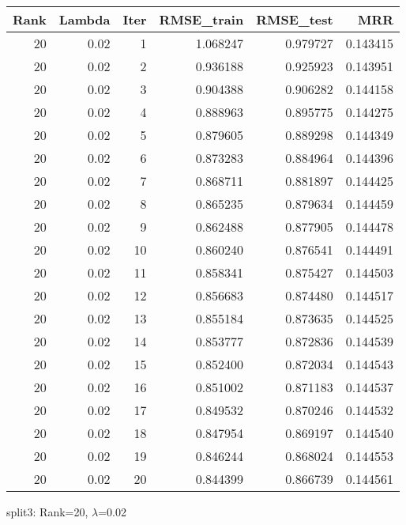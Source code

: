 \begin{tabular}{rrrrrr}
\toprule
 Rank &  Lambda &  Iter &  RMSE\_train &  RMSE\_test &       MRR \\
\midrule
   20 &    0.02 &     1 &    1.068247 &   0.979727 &  0.143415 \\
   20 &    0.02 &     2 &    0.936188 &   0.925923 &  0.143951 \\
   20 &    0.02 &     3 &    0.904388 &   0.906282 &  0.144158 \\
   20 &    0.02 &     4 &    0.888963 &   0.895775 &  0.144275 \\
   20 &    0.02 &     5 &    0.879605 &   0.889298 &  0.144349 \\
   20 &    0.02 &     6 &    0.873283 &   0.884964 &  0.144396 \\
   20 &    0.02 &     7 &    0.868711 &   0.881897 &  0.144425 \\
   20 &    0.02 &     8 &    0.865235 &   0.879634 &  0.144459 \\
   20 &    0.02 &     9 &    0.862488 &   0.877905 &  0.144478 \\
   20 &    0.02 &    10 &    0.860240 &   0.876541 &  0.144491 \\
   20 &    0.02 &    11 &    0.858341 &   0.875427 &  0.144503 \\
   20 &    0.02 &    12 &    0.856683 &   0.874480 &  0.144517 \\
   20 &    0.02 &    13 &    0.855184 &   0.873635 &  0.144525 \\
   20 &    0.02 &    14 &    0.853777 &   0.872836 &  0.144539 \\
   20 &    0.02 &    15 &    0.852400 &   0.872034 &  0.144543 \\
   20 &    0.02 &    16 &    0.851002 &   0.871183 &  0.144537 \\
   20 &    0.02 &    17 &    0.849532 &   0.870246 &  0.144532 \\
   20 &    0.02 &    18 &    0.847954 &   0.869197 &  0.144540 \\
   20 &    0.02 &    19 &    0.846244 &   0.868024 &  0.144553 \\
   20 &    0.02 &    20 &    0.844399 &   0.866739 &  0.144561 \\
\bottomrule
\end{tabular}

\caption{split3: Rank=20, $\lambda$=0.02}
